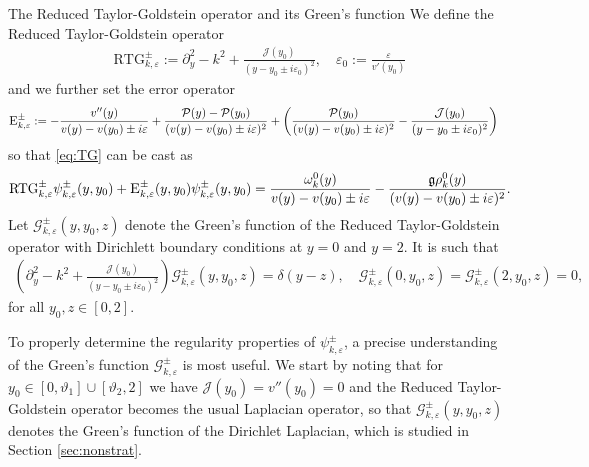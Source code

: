 \documentclass[11pt,reqno]{amsproc}
\makeatletter
\renewcommand\subsection{\@startsection{subsection}{2}%
\normalparindent{.5\linespacing\@plus.7\linespacing}{-.5em}
{\normalfont\bfseries}}
\theoremstyle{definition}
\numberwithin{equation}{section}
\newcommand{\scE}{{\textsc{E}}}
\newcommand{\G}{{\mathcal{G}}}
\newcommand{\cJ}{{\mathcal{J}}}
\newcommand{\ep}{\varepsilon}
\renewcommand{\P}{{\mathcal{P}}}
\newcommand{\p}{\partial}
\makeatother
\begin{document}
\subsection{The Reduced Taylor-Goldstein operator and its Green's function}
We define the Reduced Taylor-Goldstein operator
\begin{align}\label{eq:defRTGoperator}
\text{RTG}_{k,\ep}^\pm :=\p_y^2 - k^2 + \frac{\cJ(y_0)}{(y-y_0 \pm i\ep_0)^2},  \quad \ep_0:=\frac{\ep}{v'(y_0)}
\end{align}
and we further set the error operator
\begin{align}\label{eq:deferroroperator}
\scE_{k,\ep}^\pm &:=  -\frac{v''(y)}{v(y) - v(y_0) \pm i\ep} + \frac{\P(y) - \P(y_0)}{(v(y) - v(y_0) \pm i\ep)^2} +\left( \frac{\P(y_0)}{(v(y) - v(y_0) \pm i\ep)^2} - \frac{\cJ(y_0)}{(y-y_0\pm i\ep_0)^2}\right)
\end{align}
so that \eqref{eq:TG} can be cast as
\begin{align*}
\text{RTG}_{k,\ep}^\pm\psi_{k,\ep}^\pm(y,y_0) + \scE_{k,\ep}^\pm(y,y_0)\psi_{k,\ep}^\pm(y,y_0) = \frac{\omega_k^0(y)}{v(y)-v(y_0)\pm i\ep}-\frac{\mathfrak{g}\rho_k^0(y)}{(v(y)-v(y_0)\pm i\ep)^2}.
\end{align*}
Let $\G_{k,\ep}^\pm(y,y_0,z)$ denote the Green's function of the Reduced Taylor-Goldstein operator with Dirichlett boundary conditions at $y=0$ and $y=2$. It is such that
\begin{align*}
\left( \p_y^2 - k^2 + \frac{\cJ(y_0)}{(y-y_0 \pm i\ep_0)^2}\right) \G_{k,\ep}^\pm(y,y_0,z) = \delta(y-z), \quad \G_{k,\ep}^\pm(0,y_0,z) = \G_{k,\ep}^\pm(2,y_0,z) = 0,
\end{align*}
for all $y_0,z\in[0,2]$.

To properly determine the regularity properties of $\psi_{k,\ep}^\pm$, a precise understanding of the Green's function $\G_{k,\ep}^\pm$ is most useful. We start by noting that for $y_0\in [0,\vartheta_1]\cup [\vartheta_2,2]$ we have $\cJ(y_0) = v''(y_0) = 0$ and the Reduced Taylor-Goldstein operator becomes the usual Laplacian operator, so that $\G_{k,\ep}^\pm(y,y_0,z)$ denotes the Green's function of the Dirichlet Laplacian, which is studied in Section \ref{sec:nonstrat}.
\end{document}
